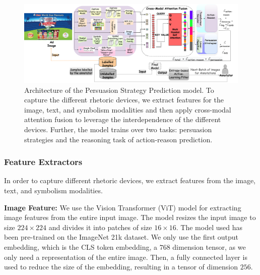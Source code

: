 \documentclass[hidelinks,11pt,a4paper]{report}
\renewcommand{\cite}[1]{\citep{#1}}
\begin{document}
\begin{figure}[h]
        \centering
        \includegraphics[width=\textwidth]{images/Persuasion-Arch-Diag-Copy-of-Model_Architecture-Page-2.drawio.png}
        \caption{\small Architecture of the Persuasion Strategy Prediction model. To capture the different rhetoric devices, we extract features for the image, text, and symbolism modalities and then apply cross-modal attention fusion to leverage the interdependence of the different devices. Further, the model trains over two tasks: persuasion strategies and the reasoning task of action-reason prediction.}
\label{fig:arch_diag}
\end{figure}




\subsubsection{Feature Extractors} 

In order to capture different rhetoric devices, we extract features from the image, text, and symbolism modalities.

\textbf{Image Feature:} We use the Vision Transformer \cite{dosovitskiy2020image} (ViT) model for extracting image features from the entire input image. The model resizes the input image to size $224 \times 224$ and divides it into patches of size $16 \times 16$. The model used has been pre-trained on the ImageNet 21k dataset. We only use the first output embedding, which is the CLS token embedding, a $768$ dimension tensor, as we only need a representation of the entire image. Then, a fully connected layer is used to reduce the size of the embedding, resulting in a tensor of dimension $256$.
\end{document}
